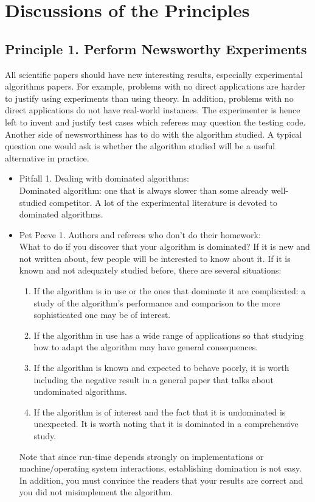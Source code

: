 \documentclass[]{scrartcl}
\begin{document}
\section{Discussions of the Principles}
\subsection*{Principle 1. Perform Newsworthy Experiments}
All scientific papers should have new interesting results, especially experimental algorithms papers. For example, problems with no direct applications are harder to justify using experiments than using theory. In addition, problems with no direct applications do not have real-world instances. The experimenter is hence left to invent and justify test cases which referees may question the testing code. Another side of newsworthiness has to do with the algorithm studied. A typical question one would ask is whether the algorithm studied will be a useful alternative in practice.  
\begin{itemize}
	\item Pitfall 1. Dealing with dominated algorithms: \\
	Dominated algorithm: one that is always slower than some already well-studied competitor. A lot of the experimental literature is devoted to dominated algorithms.  
\end{itemize}
\begin{itemize}
	\item Pet Peeve 1. Authors and referees who don't do their homework: \\
	What to do if you discover that your algorithm is dominated? 
	If it is new and not written about, few people will be interested to know about it.
	If it is known and not adequately studied before, there are several situations:
	\begin{enumerate}
		\item If the algorithm is in use or the ones that dominate it are complicated: a study of the algorithm’s performance and comparison to the more sophisticated one may be of interest.
		\item If the algorithm in use has a wide range of applications so that studying how to adapt the algorithm may have general consequences.
		\item If the algorithm is known and expected to behave poorly, it is worth including the negative result in a general paper that talks about undominated algorithms.
		\item  If the algorithm is of interest and the fact that it is undominated is unexpected. It is worth noting that it is dominated in a comprehensive study. 
	\end{enumerate}
	Note that since run-time depends strongly on implementations or machine/operating system interactions, establishing domination is not easy. In addition, you must convince the readers that your results are correct and you did not misimplement the algorithm.  
\end{itemize}
\end{document}
